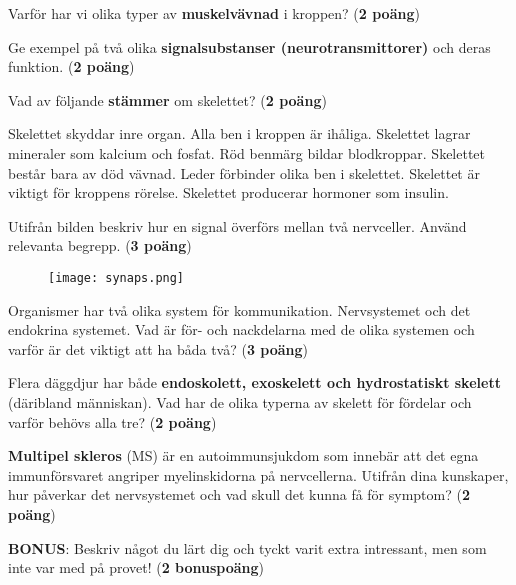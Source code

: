 \documentclass{exam}
\begin{document}
\begin{questions}
\question Varför har vi olika typer av \textbf{muskelvävnad} i kroppen? (\textbf{2 poäng})
\vspace{40mm}

\question Ge exempel på två olika \textbf{signalsubstanser (neurotransmittorer)} och deras funktion. (\textbf{2 poäng})
\vspace{20mm}

\question Vad av följande \textbf{stämmer} om skelettet? (\textbf{2 poäng})
\begin{checkboxes}
    \choice Skelettet skyddar inre organ.
    \choice Alla ben i kroppen är ihåliga.
    \choice Skelettet lagrar mineraler som kalcium och fosfat.
    \choice Röd benmärg bildar blodkroppar.
    \choice Skelettet består bara av död vävnad.
    \choice Leder förbinder olika ben i skelettet.
    \choice Skelettet är viktigt för kroppens rörelse.
    \choice Skelettet producerar hormoner som insulin.
\end{checkboxes}

\break

\vspace{5mm} %
\begin{center}
\end{center}

\question
Utifrån bilden beskriv hur en signal överförs mellan två nervceller. Använd relevanta begrepp. (\textbf{3 poäng})
\begin{figure}[h]
\texttt{[image: synaps.png]}
\end{figure}
\vspace{30mm}

\question
Organismer har två olika system för kommunikation. Nervsystemet och det endokrina systemet. Vad är för- och nackdelarna med de olika systemen och varför är det viktigt att ha båda två? (\textbf{3 poäng})

\vspace{60mm}

\break

\question Flera däggdjur har både \textbf{endoskolett, exoskelett och hydrostatiskt skelett} (däribland människan). Vad har de olika typerna av skelett för fördelar och varför behövs alla tre? (\textbf{2 poäng})

\vspace{60mm}

\question \textbf{Multipel skleros} (MS) är en autoimmunsjukdom som innebär att det egna immunförsvaret angriper myelinskidorna på nervcellerna. Utifrån dina kunskaper, hur påverkar det nervsystemet och vad skull det kunna få för symptom? (\textbf{2 poäng})

\vspace{80mm}

\question \textbf{BONUS}: Beskriv något du lärt dig och tyckt varit extra intressant, men som inte var med på provet! (\textbf{2 bonuspoäng})

\end{questions}
\end{document}
